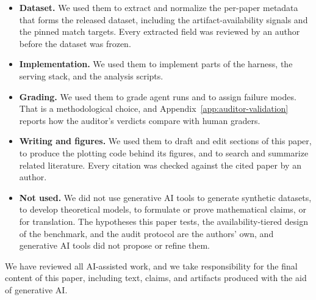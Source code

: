 \documentclass{article} %
\begin{document}
\begin{itemize}
\item \textbf{Dataset.} We used them to extract and normalize the per-paper
metadata that forms the released dataset, including the artifact-availability
signals and the pinned match targets. Every extracted field was reviewed by an
author before the dataset was frozen.
\item \textbf{Implementation.} We used them to implement parts of the harness,
the serving stack, and the analysis scripts.
\item \textbf{Grading.} We used them to grade agent runs and to assign
failure modes. That is a methodological choice, and
Appendix~\ref{app:auditor-validation} reports how the auditor's verdicts
compare with human graders.
\item \textbf{Writing and figures.} We used them to draft and edit sections of
this paper, to produce the plotting code behind its figures, and to search and
summarize related literature. Every citation was checked against the cited
paper by an author.
\item \textbf{Not used.} We did not use generative AI tools to generate
synthetic datasets, to develop theoretical models, to formulate or prove
mathematical claims, or for translation. The hypotheses this paper tests, the
availability-tiered design of the benchmark, and the audit protocol are the
authors' own, and generative AI tools did not propose or refine them.
\end{itemize}

We have reviewed all AI-assisted work, and we take responsibility for the
final content of this paper, including text, claims, and artifacts produced
with the aid of generative AI.

%
\end{document}
